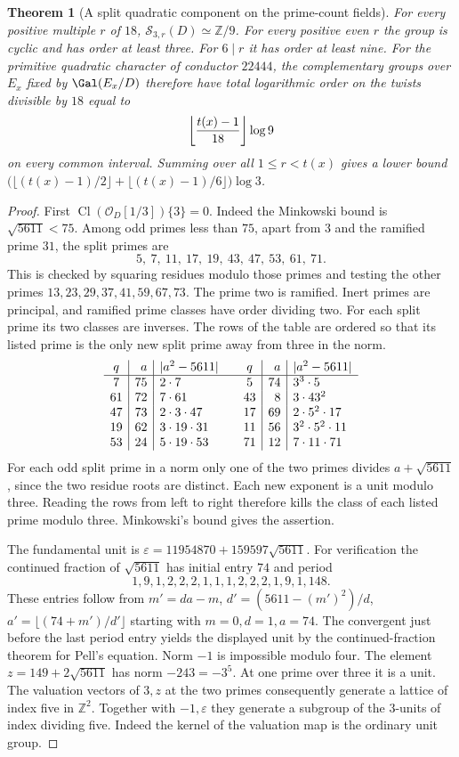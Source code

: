 \documentclass[a4paper,11pt]{article}
\newtheorem{theorem}[proposition]{Theorem}
\theoremstyle{definition}
\theoremstyle{remark}
\newcommand{\ZZ}{\mathbb Z}\newcommand{\ord}{\operatorname{ord}}
\numberwithin{equation}{section}
\newcommand{\Cl}{\operatorname{Cl}}
\begin{document}
\begin{theorem}[A split quadratic component on the prime-count fields]\leavevmode
\label{thm:splitnine319}
For every positive multiple \(r\) of \(18\),
\(\mathcal S_{3,r}(D)\simeq\ZZ/9\). For every positive
even \(r\) the group is cyclic and has order at least three.
For \(6\mid r\) it has order at least nine. For the
primitive quadratic character of conductor \(22444\),
the complementary groups over \(E_x\) fixed by
\(\Gal(E_x/D)\) therefore have total logarithmic order
on the twists divisible by \(18\) equal to
\[
       \left\lfloor{t(x)-1\over18}\right\rfloor\log 9
\]
on every common interval. Summing over all \(1\le r<t(x)\)
gives a lower bound
\(\bigl(\lfloor(t(x)-1)/2\rfloor+
         \lfloor(t(x)-1)/6\rfloor\bigr)\log3\).
\end{theorem}
\begin{proof}
First \(\Cl(\mathcal O_D[1/3])\{3\}=0\). Indeed the
Minkowski bound is \(\sqrt{5611}<75\). Among odd primes
less than \(75\), apart from \(3\) and the ramified
prime \(31\), the split primes are
\[
 5,\ 7,\ 11,\ 17,\ 19,\ 43,\ 47,\ 53,\ 61,\ 71 .
\]
This is checked by squaring residues modulo those primes
and testing the other primes \(13,23,29,37,41,59,67,73\).
The prime two is ramified. Inert primes are principal,
and ramified prime classes have order dividing two. For
each split prime its two classes are inverses. The rows
of the table are ordered so that its listed prime is the
only new split prime away from three in the norm.
\[
\begin{array}{c|r|l@{\qquad}c|r|l}
 q&a&|a^2-5611|&q&a&|a^2-5611|\\ \hline
 7&75&2\cdot7&5&74&3^3\cdot5\\
 61&72&7\cdot61&43&8&3\cdot43^2\\
 47&73&2\cdot3\cdot47&17&69&2\cdot5^2\cdot17\\
 19&62&3\cdot19\cdot31&11&56&3^2\cdot5^2\cdot11\\
 53&24&5\cdot19\cdot53&71&12&7\cdot11\cdot71
\end{array}
\]
For each odd split prime in a norm only one of the two
primes divides \(a+\sqrt{5611}\), since the two residue
roots are distinct. Each new exponent is a unit modulo
three. Reading the rows from left to right therefore
kills the class of each listed prime modulo three.
Minkowski's bound gives the assertion.

The fundamental unit is
\(\varepsilon=11954870+159597\sqrt{5611}\). For
verification the continued fraction of \(\sqrt{5611}\)
has initial entry \(74\) and period
\[
 1,9,1,2,2,2,1,1,1,2,2,2,1,9,1,148 .
\]
These entries follow from \(m'=da-m\),
\(d'=(5611-(m')^2)/d\), \(a'=\lfloor(74+m')/d'\rfloor\)
starting with \(m=0,d=1,a=74\). The convergent just
before the last period entry yields the displayed unit by
the continued-fraction theorem for Pell's equation.
Norm \(-1\) is impossible modulo four. The element
\(z=149+2\sqrt{5611}\) has norm \(-243=-3^5\). At one
prime over three it is a unit. The valuation vectors of
\(3,z\) at the two primes consequently generate a lattice
of index five in \(\ZZ^2\). Together with \(-1,\varepsilon\)
they generate a subgroup of the \(3\)-units of index
dividing five. Indeed the kernel of the valuation map
is the ordinary unit group.


\end{proof}
\end{document}
